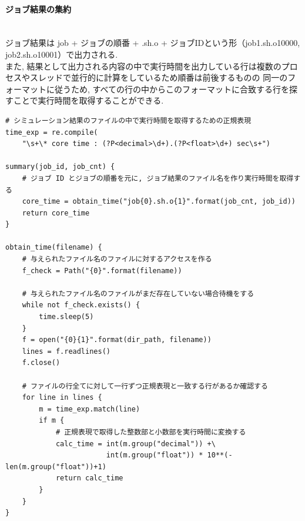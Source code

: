 \paragraph{ジョブ結果の集約}~\\
ジョブ結果は job + ジョブの順番 + .sh.o + ジョブIDという形（job1.sh.o10000, job2.sh.o10001）で出力される.\\
また, 結果として出力される内容の中で実行時間を出力している行は複数のプロセスやスレッドで並行的に計算をしているため順番は前後するものの
同一のフォーマットに従うため, すべての行の中からこのフォーマットに合致する行を探すことで実行時間を取得することができる.\\
{\footnotesize
\begin{lstlisting}[caption=ジョブ結果の集約　疑似コード, frame=single]
# シミュレーション結果のファイルの中で実行時間を取得するための正規表現
time_exp = re.compile(
    "\s+\* core time : (?P<decimal>\d+).(?P<float>\d+) sec\s+")

summary(job_id, job_cnt) {
    # ジョブ ID とジョブの順番を元に, ジョブ結果のファイル名を作り実行時間を取得する
    core_time = obtain_time("job{0}.sh.o{1}".format(job_cnt, job_id))
    return core_time
}

obtain_time(filename) {
    # 与えられたファイル名のファイルに対するアクセスを作る
    f_check = Path("{0}".format(filename))

    # 与えられたファイル名のファイルがまだ存在していない場合待機をする
    while not f_check.exists() {
        time.sleep(5)
    }
    f = open("{0}{1}".format(dir_path, filename))
    lines = f.readlines()
    f.close()

    # ファイルの行全てに対して一行ずつ正規表現と一致する行があるか確認する
    for line in lines {
        m = time_exp.match(line)
        if m {
            # 正規表現で取得した整数部と小数部を実行時間に変換する
            calc_time = int(m.group("decimal")) +\
                        int(m.group("float")) * 10**(-len(m.group("float"))+1)
            return calc_time
        }
    }
}
\end{lstlisting}
}

